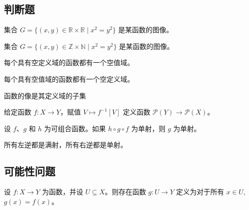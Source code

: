 \subsection*{判断题}


\begin{chapex} %
\label{cqFunctionsTFBegin}
集合 $G = \{ (x,y) \in \mathbb{R} \times \mathbb{R} \mid x^2=y^2 \}$ 是某函数的图像。
\end{chapex}

\begin{chapex} %
集合 $G = \{ (x,y) \in \mathbb{Z}\times \mathbb{N} \mid x^2=y^2 \}$ 是某函数的图像。
\end{chapex}

\begin{chapex} %
每个具有空定义域的函数都有一个空值域。
\end{chapex}

\begin{chapex} %
每个具有空值域的函数都有一个空定义域。
\end{chapex}

\begin{chapex} %
函数的像是其定义域的子集
\end{chapex}

\begin{chapex} %
给定函数 $f : X \to Y$，赋值 $V \mapsto f^{-1}[V]$ 定义函数 $\mathcal{P}(Y) \to \mathcal{P}(X)$。
\end{chapex}

\begin{chapex} %
设 $f$、$g$ 和 $h$ 为可组合函数。如果 $h \circ g \circ f$ 为单射，则 $g$ 为单射。
\end{chapex}

\begin{chapex} %
\label{cqFunctionsTFEnd}
所有左逆都是满射，所有右逆都是单射。
\end{chapex}

\subsection*{可能性问题}


\begin{chapex} %
\label{cqFunctionsASNBegin}
设 $f : X \to Y$ 为函数，并设 $U \subseteq X$。则存在函数 $g : U \to Y$ 定义为对于所有 $x \in U$, $g(x) = f(x)$。
\end{chapex}

